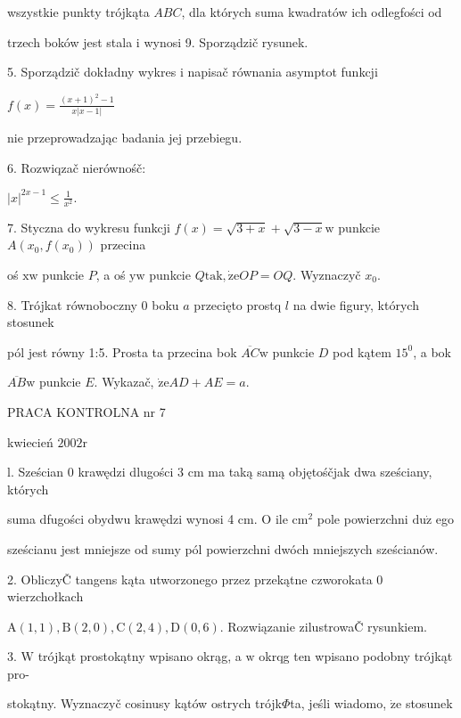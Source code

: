 \documentclass[a4paper,12pt]{article}
\begin{document}
wszystkie punkty trójkąta $ABC$, dla których suma kwadratów ich odlegfości od

trzech boków jest stala $\mathrm{i}$ wynosi 9. Sporządzič rysunek.

5. Sporządzič dokładny wykres $\mathrm{i}$ napisač równania asymptot funkcji

$f(x)=\displaystyle \frac{(x+1)^{2}-1}{x|x-1|}$

nie przeprowadzając badania jej przebiegu.

6. Rozwiqzač nierównośč:

$|x|^{2x-1}\displaystyle \leq\frac{1}{x^{2}}.$

7. Styczna do wykresu funkcji $f(x)=\sqrt{3+x}+\sqrt{3-x}\mathrm{w}$ punkcie $A(x_{0},f(x_{0}))$ przecina

oś $\mathrm{x}\mathrm{w}$ punkcie $P$, a oś $\mathrm{y}\mathrm{w}$ punkcie $Q\mathrm{t}\mathrm{a}\mathrm{k}, \dot{\mathrm{z}}\mathrm{e}OP=OQ$. Wyznaczyč $x_{0}.$

8. Trójkat równoboczny $0$ boku $a$ przecięto prostq $l$ na dwie figury, których stosunek

pól jest równy 1:5. Prosta ta przecina bok $\overline{AC}\mathrm{w}$ punkcie $D$ pod kątem $15^{0}$, a bok

$\overline{AB}\mathrm{w}$ punkcie $E$. Wykazač, $\dot{\mathrm{z}}\mathrm{e}AD+AE=a.$





PRACA KONTROLNA nr 7

kwiecień $2002\mathrm{r}$

l. Sześcian $0$ krawędzi dlugości 3 cm ma taką samą objętośčjak dwa sześciany, których

suma dfugości obydwu krawędzi wynosi 4 cm. $\mathrm{O}$ ile $\mathrm{c}\mathrm{m}^{2}$ pole powierzchni $\mathrm{d}\mathrm{u}\dot{\mathrm{z}}$ ego

sześcianu jest mniejsze od sumy pól powierzchni dwóch mniejszych sześcianów.

2. ObliczyČ tangens kąta utworzonego przez przekątne czworokata $0$ wierzchołkach

$\mathrm{A}(1,1), \mathrm{B}(2,0), \mathrm{C}(2,4), \mathrm{D}(0,6)$. Rozwiązanie zilustrowaČ rysunkiem.

3. $\mathrm{W}$ trójkąt prostokątny wpisano okrąg, a $\mathrm{w}$ okrqg ten wpisano podobny trójkąt pro-

stokątny. Wyznaczyč cosinusy kątów ostrych trójk$\Phi$ta, jeśli wiadomo, $\dot{\mathrm{z}}\mathrm{e}$ stosunek
\end{document}
